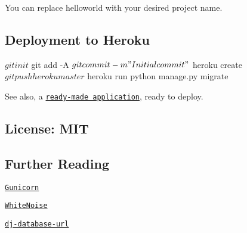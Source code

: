 You can replace {\ttfamily helloworld} with your desired project name.

\subsection*{Deployment to Heroku}

\begin{DoxyVerb}$ git init
$ git add -A
$ git commit -m "Initial commit"

$ heroku create
$ git push heroku master

$ heroku run python manage.py migrate
\end{DoxyVerb}


See also, a \href{https://github.com/heroku/python-getting-started}{\tt ready-\/made application}, ready to deploy.

\subsection*{License\+: M\+IT}

\subsection*{Further Reading}


\begin{DoxyItemize}
\item \href{https://warehouse.python.org/project/gunicorn/}{\tt Gunicorn}
\item \href{https://warehouse.python.org/project/whitenoise/}{\tt White\+Noise}
\item \href{https://warehouse.python.org/project/dj-database-url/}{\tt dj-\/database-\/url} 
\end{DoxyItemize}